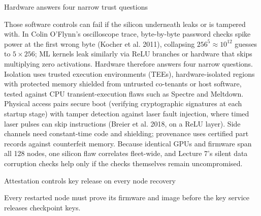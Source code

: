 \documentclass[aspectratio=169, 12pt]{beamer}
\begin{document}
\begin{frame}{Hardware answers four narrow trust questions}
{  Those software controls can fail if the silicon underneath leaks or is tampered with. In Colin O'Flynn's oscilloscope trace, byte-by-byte password checks spike power at the first wrong byte (Kocher et al. 2011), collapsing $256^5 \approx 10^{12}$ guesses to $5 \times 256$; ML kernels leak similarly via ReLU branches or hardware that skips multiplying zero activations. Hardware therefore answers four narrow questions. Isolation uses trusted execution environments (TEEs), hardware-isolated regions with protected memory shielded from untrusted co-tenants or host software, tested against CPU transient-execution flaws such as Spectre and Meltdown. Physical access pairs secure boot (verifying cryptographic signatures at each startup stage) with tamper detection against laser fault injection, where timed laser pulses can skip instructions (Breier et al. 2018, on a ReLU layer). Side channels need constant-time code and shielding; provenance uses certified part records against counterfeit memory. Because identical GPUs and firmware span all 128 nodes, one silicon flaw correlates fleet-wide, and Lecture 7's silent data corruption checks help only if the checks themselves remain uncompromised.

}
\end{frame}

\begin{frame}{Attestation controls key release on every node recovery}
  \centering
  \\[0.08cm]
  {\footnotesize Every restarted node must prove its firmware and image before the key service releases checkpoint keys.\par}
\end{frame}
\end{document}
